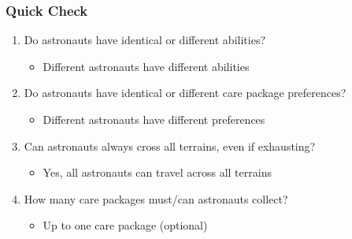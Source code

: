 \documentclass{beamer}
\begin{document}
\begin{frame}
\frametitle{Quick Check}
\begin{enumerate}
    \item Do astronauts have identical or different abilities?
    \begin{itemize}
        \item[\textbf{Answer:}] Different astronauts have different abilities
    \end{itemize}
    \vspace{0.3cm}
    \item Do astronauts have identical or different care package preferences?
    \begin{itemize}
        \item[\textbf{Answer:}] Different astronauts have different preferences
    \end{itemize}
    \vspace{0.3cm}
    \item Can astronauts always cross all terrains, even if exhausting?
    \begin{itemize}
        \item[\textbf{Answer:}] Yes, all astronauts can travel across all terrains
    \end{itemize}
    \vspace{0.3cm}
    \item How many care packages must/can astronauts collect?
    \begin{itemize}
        \item[\textbf{Answer:}] Up to one care package (optional)
    \end{itemize}
\end{enumerate}
\end{frame}
\end{document}
